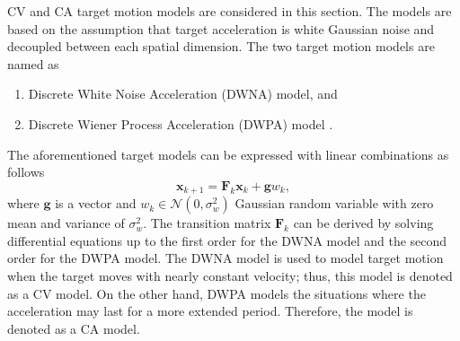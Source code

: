 \documentclass[english, 12pt, a4paper, elec, utf8, a-1b, online]{aaltothesis}
\renewcommand{\vec}[1]{\mathbf{#1}}
\newcommand{\normal}[2]{\mathcal{N}\left(#1, #2 \right)}
\begin{document}
CV and CA target motion models are considered in this section.
The models are based on the assumption that target acceleration is white Gaussian noise and decoupled between each spatial dimension.
The two target motion models are named as
\begin{enumerate}
    \item Discrete White Noise Acceleration (DWNA) model, and
    \item Discrete Wiener Process Acceleration (DWPA) model \cite{BarShalom2001}.
\end{enumerate}
The aforementioned target models can be expressed with linear combinations as follows
\begin{equation}
    \vec{x}_{k+1} = \mathbf{F}_k \vec{x}_k + \vec{g} w_k,
\end{equation}
where $\vec{g}$ is a vector and $w_k \in \normal{0}{\sigma_w^2}$ Gaussian random variable with zero mean and variance of $\sigma_w^2$.
The transition matrix $\mathbf{F}_k$ can be derived by solving differential equations up to the first order for the DWNA model and the second order for the DWPA model.
The DWNA model is used to model target motion when the target moves with nearly constant velocity; thus, this model is denoted as a CV model.
On the other hand, DWPA models the situations where the acceleration may last for a more extended period. 
Therefore, the model is denoted as a CA model.
\end{document}

